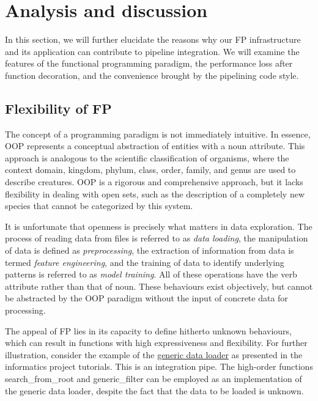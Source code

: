 \documentclass[a4paper,12pt]{article}
\newcommand{\inlinecode}[1]{{\ttfamily\footnotesize{#1}}}
\begin{document}
\section*{Analysis and discussion}

In this section, we will further elucidate the reasons why our FP infrastructure and its application can contribute to pipeline integration. We will examine the features of the functional programming paradigm, the performance loss after function decoration, and the convenience brought by the pipelining code style.\par

\subsection*{Flexibility of FP}

The concept of a programming paradigm is not immediately intuitive. In essence, OOP represents a conceptual abstraction of entities with a noun attribute. This approach is analogous to the scientific classification of organisms, where the context domain, kingdom, phylum, class, order, family, and genus are used to describe creatures. OOP is a rigorous and comprehensive approach, but it lacks flexibility in dealing with open sets, such as the description of a completely new species that cannot be categorized by this system.\par

It is unfortunate that openness is precisely what matters in data exploration. The process of reading data from files is referred to as \emph{data loading}, the manipulation of data is defined as \emph{preprocessing}, the extraction of information from data is termed \emph{feature engineering}, and the training of data to identify underlying patterns is referred to as \emph{model training}. All of these operations have the verb attribute rather than that of noun. These behaviours exist objectively, but cannot be abstracted by the OOP paradigm without the input of concrete data for processing.\par

The appeal of FP lies in its capacity to define hitherto unknown behaviours, which can result in functions with high expressiveness and flexibility. For further illustration, consider the example of the \href{https://informatics.readthedocs.io/en/latest/tutorial/tut\_inflow.html#meta-data-loader}{generic data loader} as presented in the informatics project tutorials. This is an integration pipe. The high-order functions \inlinecode{search\_from\_root} and \inlinecode{generic\_filter} can be employed as an implementation of the generic data loader, despite the fact that the data to be loaded is unknown.\par
\end{document}
